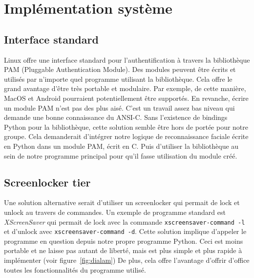 \chapter{Implémentation système}
\newpage

\section{Interface standard}

Linux offre une interface standard pour l'authentification à travers la
bibliothèque PAM (Pluggable Authentication Module). Des modules peuvent être
écrits et utilisés par n'importe quel programme utilisant la bibliothèque.
Cela offre le grand avantage d'être très portable et modulaire. Par exemple, de
cette manière, MacOS et Android pourraient potentiellement être supportés.
En revanche, écrire un module PAM n'est pas des plus aisé. C'est un travail
assez bas niveau qui demande une bonne connaissance du ANSI-C.
Sans l'existence de bindings Python pour la bibliothèque, cette solution semble
être hors de portée pour notre groupe. Cela demanderait d'intégrer notre logique
de reconnaissance faciale écrite en Python dans un module PAM, écrit en C. Puis
d'utiliser la bibliothèque au sein de notre programme principal pour qu'il fasse
utilisation du module créé.

\section{Screenlocker tier}

Une solution alternative serait d'utiliser un screenlocker qui permait de lock
et unlock au travers de commandes. Un exemple de programme standard est
\mbox{\emph{XScreenSaver}} qui permait de lock avec la commande
\verb|xscreensaver-command -l| et d'unlock avec \verb|xscreensaver-command -d|.
Cette solution implique d'appeler le programme en question depuis notre propre
programme Python. Ceci est moins portable et ne laisse pas autant de liberté, mais
est plus simple et plus rapide à implémenter (voir figure~\ref{fig:dialam})
De plus, cela offre l'avantage d'offrir d'office toutes les fonctionnalités du
programme utilisé.
